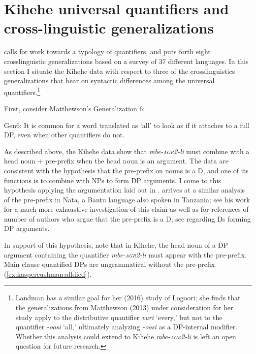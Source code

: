 \documentclass[output=paper,modfonts,nonflat]{langsci/langscibook}
\begin{document}
 

\section{Kihehe universal quantifiers and cross-linguistic generalizations}\label{sec:kaspercushman:5}  \label{ex:kaspercushman:type}
\citet{Matthewson2013} calls for work towards a typology of quantifiers, and puts forth eight crosslinguistic generalizations based on a survey of 37 different languages. In this section I situate the Kihehe data with respect to three of the crosslinguistics generalizations that bear on syntactic differences among the universal quantifiers.\footnote{Landman has a similar goal for her (2016) study of Logoori; she finds that the generalizations from Matthewson (2013) under consideration for her study apply to the distributive quantifier \textit{vuri} `every,' but not to the quantifier \textit{-oosi} `all,' ultimately analyzing \textit{-oosi} as a DP-internal modifier. Whether this analysis could extend to Kihehe \textit{mbe-\textsc{agr2}-li} is left an open question for future research.}  



First, consider Matthewson's Generalization 6:

\begin{exe}
\ex Gen6: It is common for a word translated as `all' to look as if it attaches to a full DP, even when other quantifiers do not. \citep[35]{matthewson13}
\end{exe}

As described above, the Kihehe data show that \textit{mbe-\textsc{agr2}-li} must combine with a head noun + pre-prefix when the head noun is an argument. The data are consistent with the hypothesis that the pre-prefix on nouns is a D, and one of its functions is to combine with NPs to form DP arguments. I come to this hypothesis applying the argumentation laid out in \citealt{matthewson01}. \citealt{gambarage16} arrives at a similar analysis of the pre-prefix in Nata, a Bantu language also spoken in Tanzania; see his work for a much more exhaustive investigation of this claim as well as for references of number of authors who argue that the pre-prefix is a D; see \citealt{longobardi94} regarding Ds forming DP arguments.

In support of this hypothesis, note that in Kihehe, the head noun of a DP argument containing the quantifier \textit{mbe-\textsc{agr2}-li} must appear with the pre-prefix. Main clause quantified DPs are ungrammatical without the pre-prefix (\ref{ex:kaspercushman:alldied}).
\end{document}
